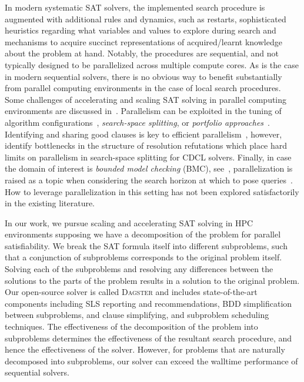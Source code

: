 \documentclass[
10pt, %
a4paper, %
oneside, %
headinclude,footinclude, %
BCOR5mm, %
]{scrartcl}
\begin{document}
In modern systematic SAT solvers, the implemented search procedure is augmented with additional rules and dynamics, such as restarts,  sophisticated heuristics regarding what variables and values to explore during search and mechanisms to acquire succinct representations of acquired/learnt knowledge about the problem at hand.
Notably, the procedures are sequential, and not typically designed to be parallelized across multiple compute cores.
As is the case in modern sequential solvers, there is no obvious way to benefit substantially from parallel computing environments in the case of local search procedures.
Some challenges of accelerating and scaling SAT solving in parallel computing environments are discussed in~\cite{AAAI125001}.
Parallelism can be exploited in the tuning of algorithm configurations~\cite{birattari:etal:2010}, {\em search-space splitting}, or {\em portfolio approaches}~\cite{lindauer:etal:2017,lindauer:etal:2015,hutter:etal:2009}.
Identifying and sharing good clauses is key to efficient parallelism~\cite{audemard:and:simon:2009}, however, \cite{katsirelos:2013} identify bottlenecks in the structure of resolution refutations which place hard limits on parallelism in search-space splitting for CDCL solvers.
Finally, in case the domain of interest is {\em bounded model checking} (BMC), see~\cite{biere:etal:2003}, parallelization is raised as a topic when considering the search horizon at which to pose queries~\cite{rintanen:2004,streeter:and:smith:2007}.
How to leverage parallelization in this setting has not been explored satisfactorily in the existing literature. 

In our work, we pursue scaling and accelerating SAT solving in HPC environments supposing we have a decomposition of the problem for parallel satisfiability.
We break the SAT formula itself into different subproblems, such that a conjunction of subproblems corresponds to the original problem itself.
Solving each of the subproblems and resolving any differences between the solutions to the parts of the problem results in a solution to the original problem.
Our open-source solver is called \textsc{Dagster} and includes state-of-the-art components including SLS reporting and recommendations, BDD simplification between subproblems, and clause simplifying, and subproblem scheduling techniques.
The effectiveness of the decomposition of the problem into subproblems determines the effectiveness of the resultant search procedure, and hence the effectiveness of the solver.
However, for problems that are naturally decomposed into subproblems, our solver can exceed the walltime performance of sequential solvers.
\end{document}
